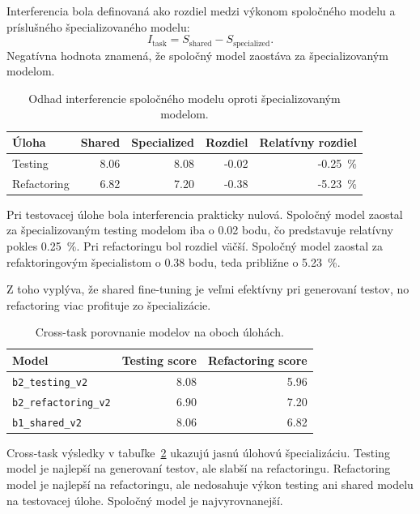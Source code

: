 \documentclass[11pt,a4paper]{article}
\newcommand{\modeltest}{\texttt{b2\_testing\_v2}}
\newcommand{\modelref}{\texttt{b2\_refactoring\_v2}}
\newcommand{\modelshared}{\texttt{b1\_shared\_v2}}
\begin{document}
Interferencia bola definovaná ako rozdiel medzi výkonom spoločného modelu a príslušného špecializovaného modelu:
\begin{equation}
I_{\text{task}} = S_{\text{shared}} - S_{\text{specialized}}.
\end{equation}
Negatívna hodnota znamená, že spoločný model zaostáva za špecializovaným modelom.

\begin{table}[h]
\centering
\begin{tabular}{lrrrr}
\toprule
Úloha & Shared & Specialized & Rozdiel & Relatívny rozdiel \\
\midrule
Testing & 8.06 & 8.08 & -0.02 & -0.25~\% \\
Refactoring & 6.82 & 7.20 & -0.38 & -5.23~\% \\
\bottomrule
\end{tabular}
\caption{Odhad interferencie spoločného modelu oproti špecializovaným modelom.}
\label{tab:interference}
\end{table}

Pri testovacej úlohe bola interferencia prakticky nulová. Spoločný model zaostal za špecializovaným testing modelom iba o 0.02 bodu, čo predstavuje relatívny pokles 0.25~\%. Pri refactoringu bol rozdiel väčší. Spoločný model zaostal za refaktoringovým špecialistom o 0.38 bodu, teda približne o 5.23~\%.

Z toho vyplýva, že shared fine-tuning je veľmi efektívny pri generovaní testov, no refactoring viac profituje zo špecializácie.

\begin{table}[h]
\centering
\begin{tabular}{lrr}
\toprule
Model & Testing score & Refactoring score \\
\midrule
\modeltest & 8.08 & 5.96 \\
\modelref & 6.90 & 7.20 \\
\modelshared & 8.06 & 6.82 \\
\bottomrule
\end{tabular}
\caption{Cross-task porovnanie modelov na oboch úlohách.}
\label{tab:cross-task}
\end{table}

Cross-task výsledky v tabuľke~\ref{tab:cross-task} ukazujú jasnú úlohovú špecializáciu. Testing model je najlepší na generovaní testov, ale slabší na refactoringu. Refactoring model je najlepší na refactoringu, ale nedosahuje výkon testing ani shared modelu na testovacej úlohe. Spoločný model je najvyrovnanejší.
\end{document}

